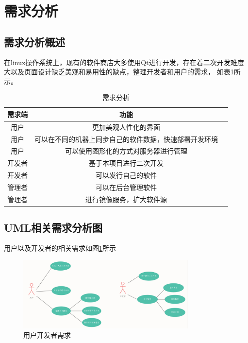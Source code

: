 \documentclass[supercite]{Experimental_Report}
\theoremstyle{definition}
\begin{document}
\section{需求分析}

\subsection{需求分析概述}
在linux操作系统上，现有的软件商店大多使用Qt进行开发，存在着二次开发难度大以及页面设计缺乏美观和易用性的缺点，整理开发者和用户的需求，
如表1所示。

\begin{table}[!h]
    \setlength{\tabcolsep}{3mm}{}
    \begin{center}
        \begin{tabular}{ccc}        
            \toprule[1pt] 需求端 & 功能\\
            \midrule[1pt]
            用户 & 更加美观人性化的界面\\
            用户 & 可以在不同的机器上同步自己的软件数据，快速部署开发环境\\
            用户 & 可以使用图形化的方式对服务器进行管理\\
            开发者 & 基于本项目进行二次开发\\
            开发者 & 可以发行自己的软件\\
            管理者 & 可以在后台管理软件\\
			管理者 & 进行镜像服务，扩大软件源 \\
            \bottomrule[1pt]
            \end{tabular}
    \end{center}
    \caption{需求分析}
\end{table}

\subsection{UML相关需求分析图}

用户以及开发者的相关需求如图\ref{user}所示

\begin{figure}[!h]
    \centering
    \includegraphics[width=0.8\textwidth]{images/require.png}
    \caption{用户开发者需求}
    \label{user}
\end{figure}
\end{document}
